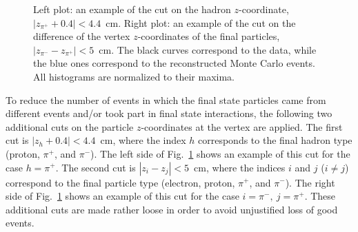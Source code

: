 \begin{figure}[!ht]
\begin{center}
\end{center}
\caption{\small Left plot: an example of the cut on the hadron $z$-coordinate, $|z_{\pi^{+}} + 0.4| < 4.4$~cm. Right plot: an example of the cut on the difference of the vertex $z$-coordinates of the final particles, $|z_{\pi^{-}} - z_{\pi^{+}}| < 5$~cm. The black curves correspond to the data, while the blue ones correspond to the reconstructed Monte Carlo events. All histograms are normalized to their maxima.}
\label{fig:add_cuts_vert}
\end{figure}
\newpage
To reduce the number of events in which the final state particles came from different events and/or took part in final state interactions, the following two additional cuts on the particle $z$-coordinates at the vertex are applied. The first cut is $|z_{h} + 0.4| < 4.4$~cm, where the index $h$ corresponds to the final hadron type (proton, $\pi^{+}$, and $\pi^{-}$). The left side of Fig.~\ref{fig:add_cuts_vert} shows an example of this cut for the case $h=\pi^{+}$. The second cut is $|z_{i} - z_{j}| < 5$~cm, where the indices $i$ and $j$ ($i\neq j$) correspond to the final particle type (electron, proton, $\pi^{+}$, and $\pi^{-}$). The right side of Fig.~\ref{fig:add_cuts_vert} shows an example of this cut for the case $i=\pi^{-},~j=\pi^{+}$. These additional cuts are made rather loose in order to avoid unjustified loss of good events.



